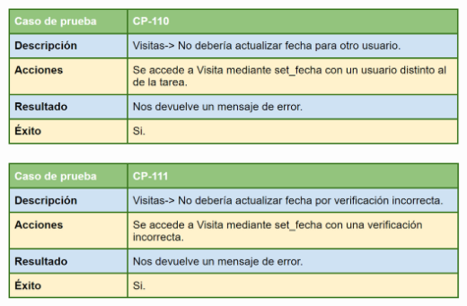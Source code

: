 \bigskip

\includegraphics[width=\textwidth]{img/cap7/cp-110.png}

\bigskip

\includegraphics[width=\textwidth]{img/cap7/cp-111.png}

	


